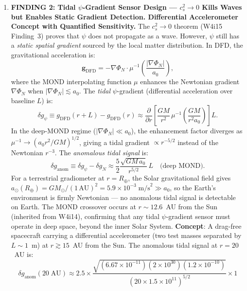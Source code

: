\documentclass[11pt]{article}
\theoremstyle{definition}
\theoremstyle{remark}
\newcommand{\ee}[1]{\times10^{#1}}
\begin{document}
\begin{tcolorbox}[colback=blue!5!white, colframe=blue!60!black,
  title=\textbf{TOP 5 FINDINGS --- W4i16 P6 (Ranked by Impact)}]
\begin{enumerate}[nosep]
\item \textbf{FINDING 2: Tidal $\psi$-Gradient Sensor Design ---
  $c_s^2 \to 0$ Kills Waves but Enables Static Gradient Detection.
  Differential Accelerometer Concept with Quantified Sensitivity.}
  The $c_s^2 \to 0$ theorem (W4i15 Finding~3) proves that $\psi$
  does not propagate as a wave.  However, $\psi$ still has a
  \emph{static spatial gradient} sourced by the local matter
  distribution.  In DFD, the gravitational acceleration is:
  \begin{equation}
  \mathbf{g}_{\mathrm{DFD}} = -\nabla\Phi_N \cdot \mu^{-1}
    \!\left(\frac{|\nabla\Phi_N|}{a_0}\right),
  \end{equation}
  where the MOND interpolating function $\mu$ enhances the
  Newtonian gradient $\nabla\Phi_N$ when $|\nabla\Phi_N| \lesssim a_0$.
  The \emph{tidal} $\psi$-gradient (differential acceleration
  over baseline $L$) is:
  \begin{equation}
  \delta g_\psi \equiv g_{\mathrm{DFD}}(r+L) - g_{\mathrm{DFD}}(r)
    \approx \frac{\partial}{\partial r}\left[
    \frac{GM}{r^2}\,\mu^{-1}\!\left(\frac{GM}{r^2 a_0}\right)
    \right] L.
  \end{equation}
  In the deep-MOND regime ($|\nabla\Phi_N| \ll a_0$), the
  enhancement factor diverges as $\mu^{-1} \to (a_0 r^2 / GM)^{1/2}$,
  giving a tidal gradient $\propto r^{-5/2}$ instead of the
  Newtonian $r^{-3}$.  The \emph{anomalous tidal signal} is:
  \begin{equation}
  \delta g_{\mathrm{anom}} \equiv \delta g_\psi - \delta g_N
    \approx \frac{5}{2}\frac{\sqrt{GM\,a_0}}{r^{5/2}}\,L
    \quad\text{(deep MOND)}.
  \end{equation}
  For a terrestrial gradiometer at $r = R_\oplus$, the Solar
  gravitational field gives $a_\odot(R_\oplus) = GM_\odot / (1\,\mathrm{AU})^2
  = 5.9\ee{-3}\;\mathrm{m/s}^2 \gg a_0$, so the Earth's environment
  is firmly Newtonian --- no anomalous tidal signal is detectable
  on Earth.  The MOND crossover occurs at $r \sim 12.6$~AU from the
  Sun (inherited from W4i14), confirming that any tidal
  $\psi$-gradient sensor must operate in deep space, beyond the
  inner Solar System.
  \textbf{Concept}: A drag-free spacecraft carrying a differential
  accelerometer (two test masses separated by $L \sim 1$~m) at
  $r \gtrsim 15$~AU from the Sun.  The anomalous tidal signal at
  $r = 20$~AU is:
  \begin{equation}
  \delta g_{\mathrm{anom}}(20\;\mathrm{AU}) \approx
    2.5 \times \frac{\sqrt{(6.67\ee{-11})(2\ee{30})(1.2\ee{-10})}}{(20 \times 1.5\ee{11})^{5/2}} \times 1

\end{equation}
\end{enumerate}
\end{tcolorbox}
\end{document}
